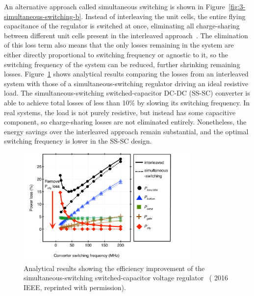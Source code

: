 \documentclass[graybox]{svmult}
\begin{document}
An alternative approach called simultaneous switching is shown in Figure~\ref{fig:3-simultaneous-switching-b}.
Instead of interleaving the unit cells, the entire flying capacitance of the regulator is switched at once, eliminating all charge-sharing between different unit cells present in the interleaved approach~\cite{Zimmer2016}.
The elimination of this loss term also means that the only losses remaining in the system are either directly proportional to switching frequency or agnostic to it, so the switching frequency of the system can be reduced, further shrinking remaining losses.
Figure~\ref{fig:3-dcdc-analysis} shows analytical results comparing the losses from an interleaved system with those of a simultaneous-switching regulator driving an ideal resistive load.
The simultaneous-switching switched-capacitor DC-DC (SS-SC) converter is able to achieve total losses of less than 10\% by slowing its switching frequency.
In real systems, the load is not purely resistive, but instead has some capacitive component, so charge-sharing losses are not eliminated entirely.
Nonetheless, the energy savings over the interleaved approach remain substantial, and the optimal switching frequency is lower in the SS-SC design.

\begin{figure}
  \centering
  \includegraphics[width=0.8\textwidth]{3-dcdc-analysis}
  \caption{Analytical results showing the efficiency improvement of the simultaneous-switching switched-capacitor voltage regulator~\cite{Zimmer2016} ({\textcopyright} 2016 IEEE, reprinted with permission).}
  \label{fig:3-dcdc-analysis}
\end{figure}
\end{document}
